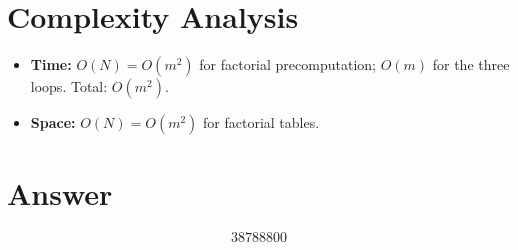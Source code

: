 \documentclass[11pt]{article}
\begin{document}
\section{Complexity Analysis}

\begin{itemize}
  \item \textbf{Time:} $O(N) = O(m^2)$ for factorial precomputation; $O(m)$ for the three loops. Total: $O(m^2)$.
  \item \textbf{Space:} $O(N) = O(m^2)$ for factorial tables.
\end{itemize}

\section{Answer}

\[
\boxed{38788800}
\]
\end{document}
